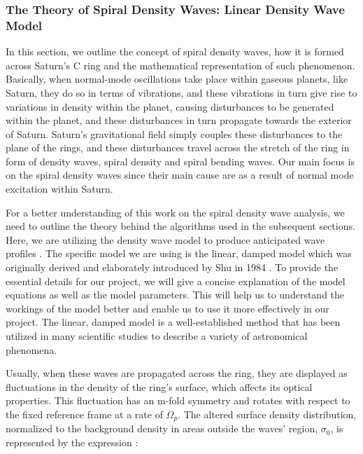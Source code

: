 \documentclass{article}
\begin{document}
\subsubsection{The Theory of Spiral Density Waves: Linear Density Wave Model}
In this section, we outline the concept of spiral density waves, how it is formed across Saturn's C ring and the mathematical representation of such phenomenon.
Basically, when normal-mode oscillations take place within gaseous planets, like Saturn, they do so in terms of vibrations, and these vibrations in turn give rise to variations in density within the planet, causing disturbances to be generated within the planet, and these disturbances in turn propagate towards the exterior of Saturn. Saturn's gravitational field simply couples these disturbances to the plane of the rings, and these disturbances travel across the stretch of the ring in form of density waves, spiral density and spiral bending waves. Our main focus is on the spiral density waves since their main cause are as a result of normal mode excitation within Saturn.


For a better understanding of this work on the spiral density wave analysis, we need to outline the theory behind the algorithms used in the subsequent sections.
Here, we are utilizing the density wave model to produce anticipated wave profiles \cite{Nicholson1990AnAR}. The specific model we are using is the linear, damped model which was originally derived and elaborately introduced by Shu in 1984 \cite{article}. To provide the essential details for our project, we will give a concise explanation of the model equations as well as the model parameters. This will help us to understand the workings of the model better and enable us to use it more effectively in our project. The linear, damped model is a well-established method that has been utilized in many scientific studies to describe a variety of astronomical phenomena.


Usually, when these waves are propagated across the ring, they are displayed as fluctuations in the density of the ring's surface, which affects its optical properties. This fluctuation has an m-fold symmetry and rotates with respect to the fixed reference frame at a rate of $\Omega_{p}$. The altered surface density distribution, normalized to the background density in areas outside the waves' region, $\sigma_{0}$, is represented by the expression \cite{Nicholson1990AnAR}:
\end{document}
